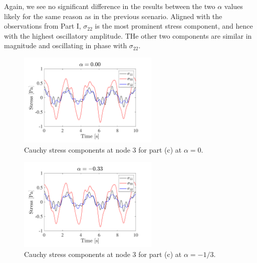 Again, we see no significant difference in the results between the two $\alpha$ values likely for the same reason as in the previous scenario. 
Aligned with the observations from Part I, $\sigma_{22}$ is the most prominent stress component, and hence with the highest oscillatory amplitude. 
THe other two components are similar in magnitude and oscillating in phase with $\sigma_{22}$.

\begin{figure}[!ht]
    \centering
    \includegraphics[width=0.6\textwidth]{final/part2/final2_shear_0.pdf}
    \caption{Cauchy stress components at node 3 for part (c) at $\alpha = 0$.}
    \label{fig:final2_shear_0}
\end{figure}

\begin{figure}[!ht]
    \centering
    \includegraphics[width=0.6\textwidth]{final/part2/final2_shear_333.pdf}
    \caption{Cauchy stress components at node 3 for part (c) at $\alpha = -1/3$.}
    \label{fig:final2_shear_3}
\end{figure}